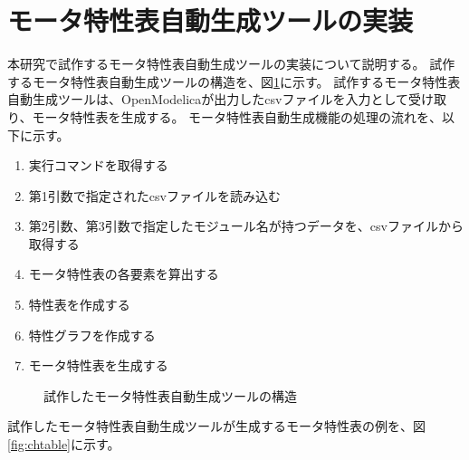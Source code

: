 \documentclass[uplatex, 10pt, a4p]{jsarticle}
\begin{document}
\section{モータ特性表自動生成ツールの実装}\label{cha:OverviewFunction}
本研究で試作するモータ特性表自動生成ツールの実装について説明する。
試作するモータ特性表自動生成ツールの構造を、図\ref{fig:kouzou}に示す。
試作するモータ特性表自動生成ツールは、OpenModelicaが出力したcsvファイルを入力として受け取り、モータ特性表を生成する。
モータ特性表自動生成機能の処理の流れを、以下に示す。
\begin{enumerate}
    \item 実行コマンドを取得する
    \item 第1引数で指定されたcsvファイルを読み込む
    \item 第2引数、第3引数で指定したモジュール名が持つデータを、csvファイルから取得する
    \item モータ特性表の各要素を算出する
    \item 特性表を作成する
    \item 特性グラフを作成する
    \item モータ特性表を生成する
\end{enumerate}
\begin{figure}[tp]
	\centering
    \caption{試作したモータ特性表自動生成ツールの構造}
	\label{fig:kouzou}
\end{figure}
試作したモータ特性表自動生成ツールが生成するモータ特性表の例を、図\ref{fig:chtable}に示す。
\end{document}
